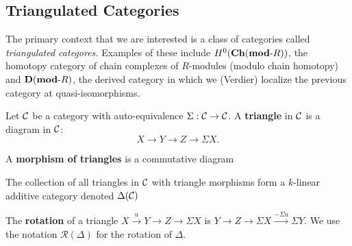 \documentclass[12pt]{article}
\begin{document}
\subsection{Triangulated Categories}
The primary context that we are interested is a class of categories called \textit{triangulated categores.} Examples of 
these include $H^0(\operatorname{\mathbf{Ch}}(\mathbf{mod}\text{-}R))$, the homotopy category of chain complexes of $R$-modules (modulo chain homotopy) and $\mathbf{D}(\mathbf{mod}\text{-}R)$,
the derived category in which we (Verdier) localize the previous category at quasi-isomorphisms.
\begin{defn}
	Let $\mathcal{C}$ be a category with auto-equivalence $\Sigma:\mathcal{C}\to\mathcal{C}$. A \textbf{triangle} in $\mathcal{C}$ is a diagram in $\mathcal{C}$:
	\[X\to Y\to Z\to\Sigma X.\]
\end{defn}
\begin{defn}
	A \textbf{morphism of triangles} is a commutative diagram
	\begin{center}
	\end{center}
\end{defn}

\begin{lem}
	The collection of all triangles in $\cal C$ with triangle morphisms form a $k$-linear additive category denoted $\Delta(\cal C)$
\end{lem}

\begin{defn}
	The \textbf{rotation} of a triangle $X\xrightarrow{u} Y\to Z\to \Sigma X$ is $Y\to Z\to \Sigma X\xrightarrow{-\Sigma u}\Sigma Y.$
	We use the notation $\mathscr R(\Delta)$ for the rotation of $\Delta$.
\end{defn}
\end{document}

